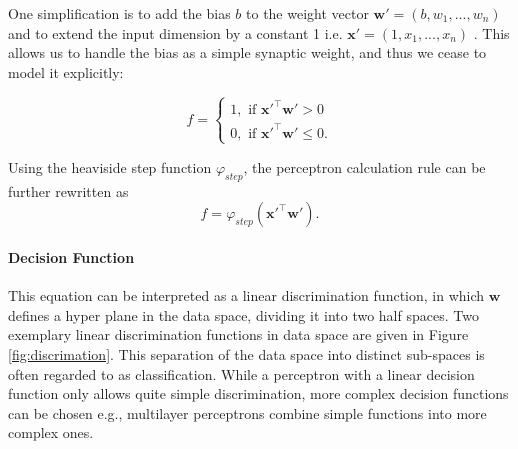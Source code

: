 One simplification is to add the bias $b$ to the weight vector $\textbf{w}' = (b , w_1, ... , w_n)$ and to extend the input dimension by a constant 1 i.e. $\textbf{x}' = (1, x_1 , ... , x_n)$ .
This allows us to handle the bias as a simple synaptic weight, and thus we cease to model it explicitly:

\[
	f = 
		\begin{cases}
			1, \text{  if  } \textbf{x}'^\intercal \textbf{w}'> 0  \\
			0, \text{  if  } \textbf{x}'^\intercal \textbf{w}' \le 0 .
		\end{cases}	
\]



Using the heaviside step function $\varphi_{step}$, the perceptron calculation rule can be further rewritten as 
\[
	f = \varphi_{step}(\textbf{x}'^\intercal \textbf{w}') .
\]   

\paragraph{Decision Function} \label{c:perdecision}

This equation can be interpreted as a linear discrimination function, in which $\textbf{w}$ defines a hyper plane in the data space, dividing it into two half spaces. 
Two exemplary linear discrimination functions in data space are given in Figure \ref{fig:discrimation}.
This separation of the data space into distinct sub-spaces is often regarded to as classification. 
While a perceptron with a linear decision function only allows quite simple discrimination, more complex decision functions can be chosen e.g., multilayer perceptrons combine simple functions into more complex ones. 

